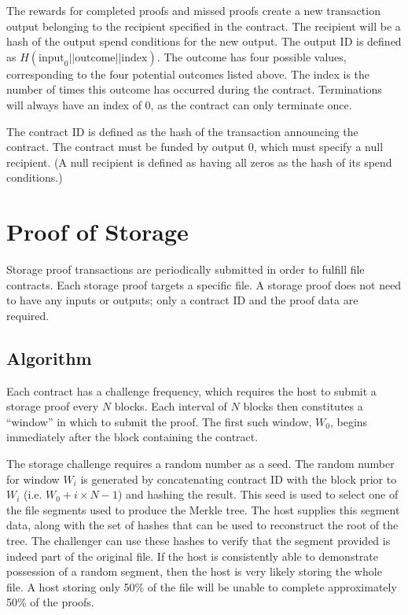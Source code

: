 \documentclass[twocolumn]{article}
\begin{document}
The rewards for completed proofs and missed proofs create a new transaction output belonging to the recipient specified in the contract.
The recipient will be a hash of the output spend conditions for the new output.
The output ID is defined as $H(\text{input}_0 || \text{outcome} || \text{index})$.
The outcome has four possible values, corresponding to the four potential outcomes listed above.
The index is the number of times this outcome has occurred during the contract.
Terminations will always have an index of 0, as the contract can only terminate once.

The contract ID is defined as the hash of the transaction announcing the contract.
The contract must be funded by output 0, which must specify a null recipient.
(A null recipient is defined as having all zeros as the hash of its spend conditions.)

\section{Proof of Storage}
\label{sec:storage}
Storage proof transactions are periodically submitted in order to fulfill file contracts.
Each storage proof targets a specific file.
A storage proof does not need to have any inputs or outputs; only a contract ID and the proof data are required.

\subsection{Algorithm}
Each contract has a challenge frequency, which requires the host to submit a storage proof every $N$ blocks.
Each interval of $N$ blocks then constitutes a ``window'' in which to submit the proof.
The first such window, $W_0$, begins immediately after the block containing the contract.

The storage challenge requires a random number as a seed.
The random number for window $W_i$ is generated by concatenating contract ID with the block prior to $W_i$ (i.e. $W_0 + i \times N - 1$) and hashing the result.
This seed is used to select one of the file segments used to produce the Merkle tree.
The host supplies this segment data, along with the set of hashes that can be used to reconstruct the root of the tree.
The challenger can use these hashes to verify that the segment provided is indeed part of the original file.
If the host is consistently able to demonstrate possession of a random segment, then the host is very likely storing the whole file.
A host storing only 50\% of the file will be unable to complete approximately 50\% of the proofs.
\end{document}
